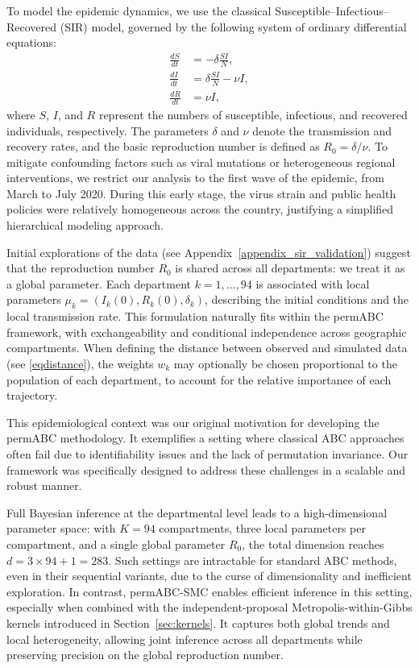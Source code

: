 \documentclass[lineno]{biometrika}
\def\locparam{\mu}
\begin{document}
To model the epidemic dynamics, we use the classical Susceptible–Infectious–Recovered (SIR) model, governed by the following system of ordinary differential equations:
\begin{equation}
    \label{eqSIR}
    \begin{split}
        \frac{dS}{dt} &= -\delta \frac{SI}{N},\\
        \frac{dI}{dt} &= \delta \frac{SI}{N} - \nu I,\\
        \frac{dR}{dt} &= \nu I,
    \end{split}
\end{equation}
where \( S \), \( I \), and \( R \) represent the numbers of susceptible, infectious, and recovered individuals, respectively. The parameters \( \delta \) and \( \nu \) denote the transmission and recovery rates, and the basic reproduction number is defined as \( R_0 = \delta / \nu \). 
To mitigate confounding factors such as viral mutations or heterogeneous regional interventions, we restrict our analysis to the first wave of the epidemic, from March to July 2020. During this early stage, the virus strain and public health policies were relatively homogeneous across the country, justifying a simplified hierarchical modeling approach.


Initial explorations of the data (see Appendix~\ref{appendix_sir_validation}) suggest that the reproduction number \( R_0 \) is shared across all departments: we treat it as a global parameter. Each department \( k =  1, \dots, 94 \) is associated with local parameters \( \locparam_k = (I_k(0), R_k(0), \delta_k) \), describing the initial conditions and the local transmission rate. This formulation naturally fits within the permABC framework, with exchangeability and conditional independence across geographic compartments. When defining the distance between observed and simulated data (see \eqref{eqdistance}), the weights \( w_k \) may optionally be chosen proportional to the population of each department, to account for the relative importance of each trajectory.

This epidemiological context was our original motivation for developing the permABC methodology. It exemplifies a setting where classical ABC approaches often fail due to identifiability issues and the lack of permutation invariance. Our framework was specifically designed to address these challenges in a scalable and robust manner.

Full Bayesian inference at the departmental level leads to a high-dimensional parameter space: with \( K = 94 \) compartments, three local parameters per compartment, and a single global parameter \( R_0 \), the total dimension reaches \( d = 3 \times 94 + 1 = 283 \). Such settings are intractable for standard ABC methods, even in their sequential variants, due to the curse of dimensionality and inefficient exploration. 
In contrast, permABC-SMC enables efficient inference in this setting, especially when combined with the independent-proposal Metropolis-within-Gibbs kernels introduced in Section~\ref{sec:kernels}. It captures both global trends and local heterogeneity, allowing joint inference across all departments while preserving precision on the global reproduction number.
\end{document}
